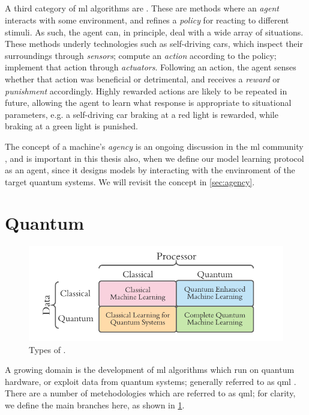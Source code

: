 \subsection{}
A third category of \gls{ml} algorithms are . 
These are methods where an \emph{agent} interacts with some environment, 
    and refines a \emph{policy} for reacting to different stimuli. 
As such, the agent can, in principle, deal with a wide array of situations. 
These methods underly technologies such as self-driving cars, 
    which inspect their surroundings through \emph{sensors};
    compute an \emph{action} according to the policy; 
    implement that action through \emph{actuators}.
Following an action, the agent senses whether that action was beneficial or detrimental, 
    and receives a \emph{reward} or \emph{punishment} accordingly. 
Highly rewarded actions are likely to be repeated in future, allowing the agent to learn what response is 
    appropriate to situational parameters, 
    e.g. a self-driving car braking at a red light is rewarded, 
    while braking at a green light is punished. 
\par 
The concept of a machine's \emph{agency} is an ongoing discussion in the \gls{ml} community \cite{franklin1996agent, wooldridge2009introduction}, 
    and is important in this thesis also, when we define our model learning protocol as an agent, 
    since it designs models by interacting with the envinroment of the target quantum systems. 
We will revisit the concept in \cref{sec:agency}.

\section{Quantum }
\begin{figure}
    \begin{center}
        \includegraphics{contextual_review/figures/qml_types.pdf}
    \end{center}
    \caption[Types of ]{Types of .}
    \label{fig:qml_types}
\end{figure}
A growing domain is the development of \gls{ml} algorithms which run on quantum hardware, 
    or exploit data from quantum systems; generally referred to as \gls{qml} \cite{biamonte2017quantum, adcock2015advances}. 
There are a number of metehodologies which are referred to as \gls{qml};
    for clarity, we define the main branches here, as shown in \cref{fig:qml_types}. 

